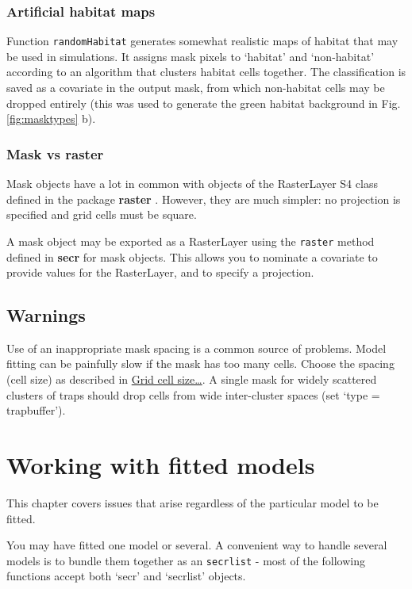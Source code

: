 \documentclass[
]{book}
\begin{document}
\subsection{Artificial habitat maps}\label{artificial-habitat-maps}

Function \texttt{randomHabitat} generates somewhat realistic maps of habitat that may be used in simulations. It assigns mask pixels to `habitat' and `non-habitat' according to an algorithm that clusters habitat cells together. The classification is saved as a covariate in the output mask, from which non-habitat cells may be dropped entirely (this was used to generate the green habitat background in Fig. \ref{fig:masktypes} b).

\subsection{Mask vs raster}\label{mask-vs-raster}

Mask objects have a lot in common with objects of the RasterLayer S4 class defined in the package \textbf{raster} \citep{R-raster}. However, they are much simpler: no projection is specified and grid cells must be square.

A mask object may be exported as a RasterLayer using the \texttt{raster} method defined in \textbf{secr} for mask objects. This allows you to nominate a covariate to provide values for the RasterLayer, and to specify a projection.

\section{Warnings}\label{warnings}

Use of an inappropriate mask spacing is a common source of problems. Model fitting can be painfully slow if the mask has too many cells. Choose the spacing (cell size) as described in \hyperref[maskspacing]{Grid cell size\ldots{}}. A single mask for widely scattered clusters of traps should drop cells from wide inter-cluster spaces (set `type = trapbuffer').

\chapter{Working with fitted models}\label{working-with-fitted-models}

This chapter covers issues that arise regardless of the particular model to be fitted.

You may have fitted one model or several. A convenient way to handle several models is to bundle them together as an \texttt{secrlist} - most of the following functions accept both `secr' and `secrlist' objects.
\end{document}
